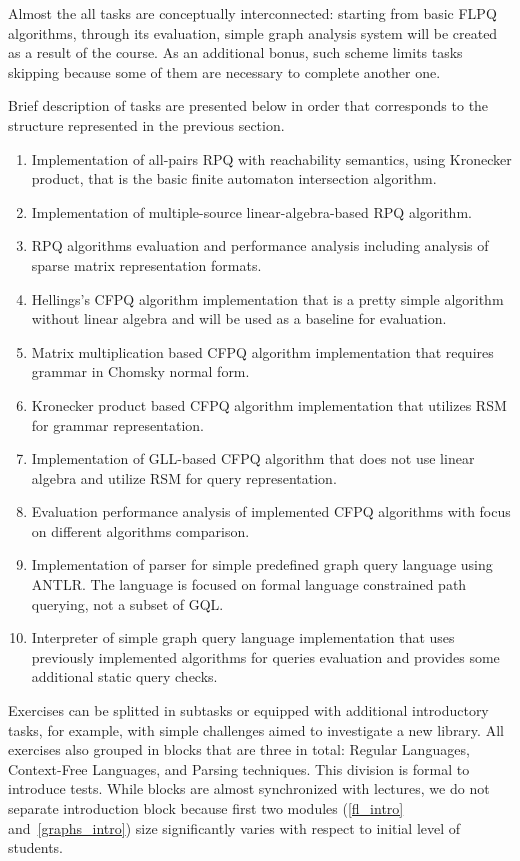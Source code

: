 \documentclass[sigconf]{acmart}
\begin{document}
Almost the all tasks are conceptually interconnected: starting from basic FLPQ algorithms, through its evaluation, simple graph analysis system will be created as a result of the course.
As an additional bonus, such scheme limits tasks skipping because some of them are necessary to complete another one.

Brief description of tasks are presented below in order that corresponds to the structure represented in the previous section.
\begin{enumerate}
  \item Implementation of all-pairs RPQ with reachability semantics, using Kronecker product, that is the basic finite automaton intersection algorithm.
  \item Implementation of multiple-source linear-algebra-based RPQ algorithm.%
  \item RPQ algorithms evaluation and performance analysis including analysis of sparse matrix representation formats.
  \item Hellings's CFPQ algorithm implementation that is a pretty simple algorithm without linear algebra and will be used as a baseline for evaluation. 
  \item Matrix multiplication based CFPQ algorithm implementation that requires grammar in Chomsky normal form.
  \item Kronecker product based CFPQ algorithm implementation that utilizes RSM for grammar representation.
  \item Implementation of GLL-based CFPQ algorithm that does not use linear algebra and utilize RSM for query representation. 
  \item Evaluation performance analysis of implemented CFPQ algorithms with focus on different algorithms comparison. 
  \item Implementation of parser for simple predefined graph query language using ANTLR. The language is focused on formal language constrained path querying, not a subset of GQL.
  \item Interpreter of simple graph query language implementation that uses previously implemented algorithms for queries evaluation and provides some additional static query checks.
\end{enumerate}

Exercises can be splitted in subtasks or equipped with additional introductory tasks, for example, with simple challenges aimed to investigate a new library.
All exercises also grouped in blocks that are three in total: Regular Languages, Context-Free Languages, and Parsing techniques.
This division is formal to introduce tests.
While blocks are almost synchronized with lectures, we do not separate introduction block because first two modules (\ref{fl_intro} and~\ref{graphs_intro}) size significantly varies with respect to initial level of students.
\end{document}
